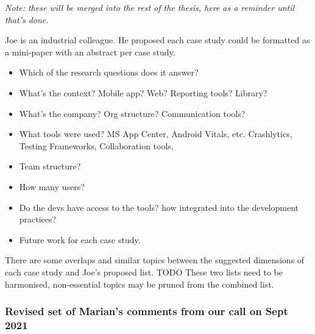 



\textit{Note: these will be merged into the rest of the thesis, here as a reminder until that's done.}

Joe is an industrial colleague. He proposed each case study could be formatted as a mini-paper with an abstract per case study.
{\small
\begin{itemize}
    \itemsep0em
    \item Which of the research questions does it answer?
    \item What’s the context? Mobile app? Web? Reporting tools? Library?
    \item What’s the company? Org structure? Communication tools?
    \item What tools were used? MS App Center, Android Vitals, etc. Crashlytics, Testing Frameworks, Collaboration tools,
    \item Team structure?
    \item How many users?
    \item Do the devs have access to the tools? how integrated into the development practices?
    \item Future work for each case study.
\end{itemize}
}
There are some overlaps and similar topics between the suggested dimensions of each case study and Joe's proposed list. TODO These two lists need to be harmonised, non-essential topics may be pruned from the combined list.


\subsubsection{Revised set of Marian's comments from our call on  Sept 2021}

